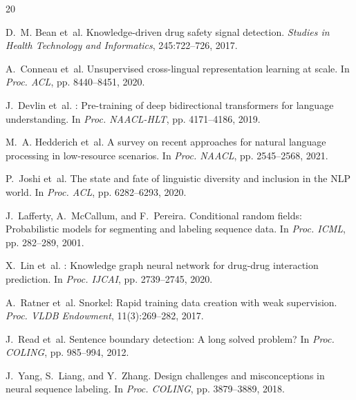 \documentclass[11pt,a4paper]{article}
\begin{document}
\begin{thebibliography}{20}

D.~M. Bean et~al.
\newblock Knowledge-driven drug safety signal detection.
\newblock \emph{Studies in Health Technology and Informatics}, 245:722--726, 2017.

A.~Conneau et~al.
\newblock Unsupervised cross-lingual representation learning at scale.
\newblock In \emph{Proc. ACL}, pp. 8440--8451, 2020.

J.~Devlin et~al.
: Pre-training of deep bidirectional transformers for language understanding.
\newblock In \emph{Proc. NAACL-HLT}, pp. 4171--4186, 2019.

M.~A. Hedderich et~al.
\newblock A survey on recent approaches for natural language processing in low-resource scenarios.
\newblock In \emph{Proc. NAACL}, pp. 2545--2568, 2021.

P.~Joshi et~al.
\newblock The state and fate of linguistic diversity and inclusion in the {NLP} world.
\newblock In \emph{Proc. ACL}, pp. 6282--6293, 2020.

J.~Lafferty, A.~McCallum, and F.~Pereira.
\newblock Conditional random fields: Probabilistic models for segmenting and labeling sequence data.
\newblock In \emph{Proc. ICML}, pp. 282--289, 2001.

X.~Lin et~al.
: Knowledge graph neural network for drug-drug interaction prediction.
\newblock In \emph{Proc. IJCAI}, pp. 2739--2745, 2020.

A.~Ratner et~al.
\newblock Snorkel: Rapid training data creation with weak supervision.
\newblock \emph{Proc. VLDB Endowment}, 11(3):269--282, 2017.

J.~Read et~al.
\newblock Sentence boundary detection: A long solved problem?
\newblock In \emph{Proc. COLING}, pp. 985--994, 2012.

J.~Yang, S.~Liang, and Y.~Zhang.
\newblock Design challenges and misconceptions in neural sequence labeling.
\newblock In \emph{Proc. COLING}, pp. 3879--3889, 2018.

\end{thebibliography}
\end{document}
